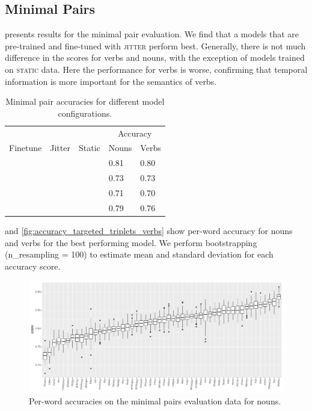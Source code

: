 \subsection{Minimal Pairs}
\label{sec:minimal-pairs}


 presents results for the minimal pair 
evaluation. We find that a models that are 
pre-trained and fine-tuned with \textsc{jitter} perform best. Generally, there 
is not much difference in the scores for verbs and nouns, with the exception of 
models trained on \textsc{static} data. Here the performance for verbs is 
worse, confirming that temporal information is more important for the semantics 
of verbs.
\begin{table}[ht]
	\centering
	\begin{tabular}{lllll}
		\toprule
		& & & \multicolumn{2}{c}{Accuracy} \\
		Finetune & Jitter & Static & Nouns & Verbs \\
		\midrule
		\checkmark & \checkmark &  & 0.81 & 0.80 \\
		\checkmark &  &  & 0.73 & 0.73  \\
		 & \checkmark &  & 0.71 & 0.70 \\
		\checkmark & \checkmark &  \checkmark & 0.79 & 0.76 \\
		\bottomrule
	\end{tabular}
	\caption{Minimal pair accuracies for different model configurations.}
	\label{tab:minimal_pair_results}
\end{table}

 and
\ref{fig:accuracy_targeted_triplets_verbs} show per-word
accuracy for nouns and verbs for the best performing model.
We perform bootstrapping (n\_resampling = 100) to estimate mean and standard 
deviation for each accuracy score.


\begin{figure}[htb]
  \centering
  \includegraphics[width=\textwidth]{results/targeted_triplets/results_per_word_version_335_NOUN.pdf}
  \caption{Per-word accuracies on the minimal pairs evaluation data for nouns.}
  \label{fig:accuracy_targeted_triplets_nouns}
\end{figure}

